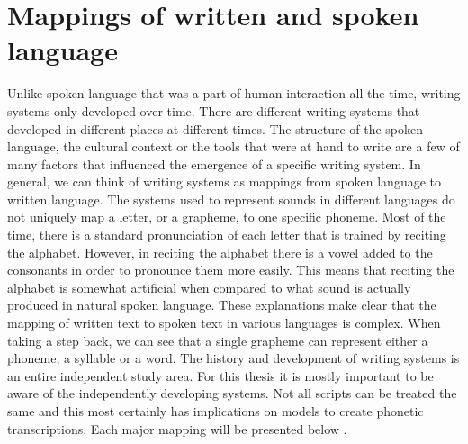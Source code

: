 
\section{Mappings of written and spoken language}
\label{writing-sys}
Unlike spoken language that was a part of human interaction all the time, writing systems only developed over time. There are different writing systems that developed in different places at different times. The structure of the spoken language, the cultural context or the tools that were at hand to write are a few of many factors that influenced the emergence of a specific writing system. In general, we can think of writing systems as mappings from spoken language to written language. The systems used to represent sounds in different languages do not uniquely map a letter, or a grapheme, to one specific phoneme. Most of the time, there is a standard pronunciation of each letter that is trained by reciting the alphabet. However, in reciting the alphabet there is a vowel added to the consonants in order to pronounce them more easily. This means that reciting the alphabet is somewhat artificial when compared to what sound is actually produced in natural spoken language. These explanations make clear that the mapping of written text to spoken text in various languages is complex. When taking a step back, we can see that a single grapheme can represent either a phoneme, a syllable or a word. The history and development of writing systems is an entire independent study area. For this thesis it is mostly important to be aware of the independently developing systems. Not all scripts can be treated the same and this most certainly has implications on models to create phonetic transcriptions. Each major mapping will be presented below \citep{writing-systems}.


